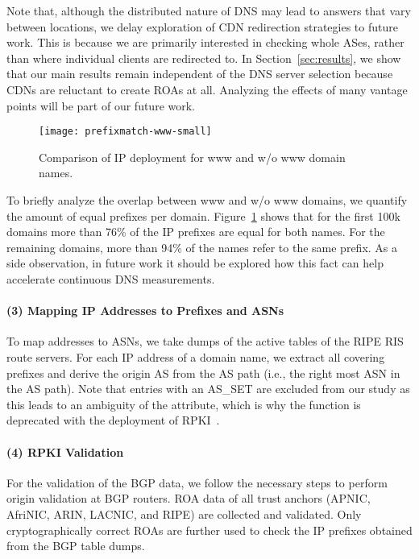 Note that, although the distributed nature of DNS may lead to  answers that vary between locations, we delay exploration of CDN redirection strategies to future work.
This is because we are primarily interested in checking whole ASes, rather than where individual clients are redirected to.
In Section~\ref{sec:results}, we show that our main results remain independent of the DNS server selection because CDNs are reluctant to create ROAs at all.
Analyzing the effects of many vantage points will be part of our future work.















\begin{figure}
  \texttt{[image: prefixmatch-www-small]}
  \caption{Comparison of IP deployment for www and w/o www domain names.}
  \label{fig:prefixmatch-www}
\end{figure}


To briefly analyze the overlap between www and w/o www domains, we quantify
the amount of equal prefixes per domain. Figure~\ref{fig:prefixmatch-www}
shows that for the first 100k domains more than 76\% of the IP prefixes are
equal for both names. For the remaining domains, more than 94\% of the names
refer to the same prefix. As a side observation, in future work it should be explored how this fact can help accelerate continuous DNS measurements.



\paragraph*{(3) Mapping IP Addresses to Prefixes and ASNs}
To map addresses to ASNs, we take dumps of the active tables of the RIPE RIS route servers. For each IP address of a domain
name, we extract all covering prefixes and derive the origin AS from the AS
path (i.e., the right most ASN in the AS path). Note that entries with an
AS\_SET are excluded from our study as this leads to an ambiguity of the attribute, which is why the 
function is deprecated with the deployment of RPKI~\cite{RFC-6472}.


\paragraph*{(4) RPKI Validation}
For the validation of the BGP data, we follow the necessary steps to
perform origin validation at BGP routers. ROA data of all trust anchors (APNIC, AfriNIC, ARIN, LACNIC, and
RIPE) are collected and validated. Only cryptographically correct ROAs are
further used to check the IP prefixes obtained 
from the BGP table dumps.


